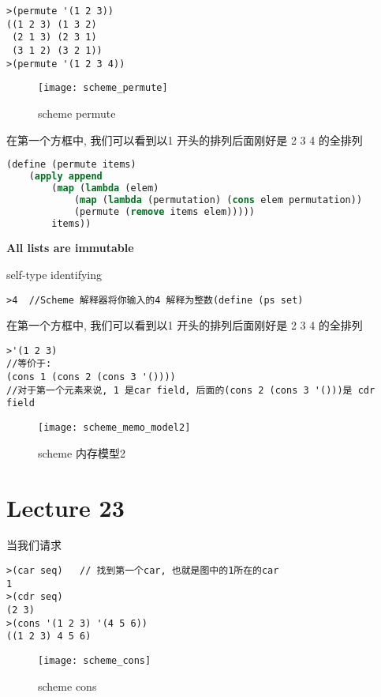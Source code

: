 \documentclass{article}
\begin{document}
\begin{verbatim}
>(permute '(1 2 3))
((1 2 3) (1 3 2)
 (2 1 3) (2 3 1)
 (3 1 2) (3 2 1))
>(permute '(1 2 3 4))
\end{verbatim}
\begin{figure}[htbp]
	\centering
	\texttt{[image: scheme\_permute]}\\
	\caption{scheme permute}\label{fig.scheme.permute}
\end{figure}

在第一个方框中, 我们可以看到以1 开头的排列后面刚好是 2 3 4 的全排列

\begin{lstlisting}[language = Lisp]
(define (permute items)
	(apply append
		(map (lambda (elem)
			(map (lambda (permutation) (cons elem permutation))
			(permute (remove items elem)))))
		items))
\end{lstlisting}

\textbf{All lists are immutable}

self-type identifying
\begin{verbatim}
>4  //Scheme 解释器将你输入的4 解释为整数(define (ps set)
\end{verbatim}
在第一个方框中, 我们可以看到以1 开头的排列后面刚好是 2 3 4 的全排列

\begin{verbatim}
>'(1 2 3)
//等价于:
(cons 1 (cons 2 (cons 3 '())))
//对于第一个元素来说, 1 是car field, 后面的(cons 2 (cons 3 '()))是 cdr field
\end{verbatim}
\begin{figure}[htbp]
	\centering
	\texttt{[image: scheme\_memo\_model2]}\\
	\caption{scheme 内存模型2}\label{fig.scheme.memo.model2}
\end{figure}

\section{Lecture 23}
当我们请求
\begin{verbatim}
>(car seq)   // 找到第一个car, 也就是图中的1所在的car
1
>(cdr seq)
(2 3)
>(cons '(1 2 3) '(4 5 6))
((1 2 3) 4 5 6)
\end{verbatim}
\begin{figure}[htbp]
	\centering
	\texttt{[image: scheme\_cons]}\\
	\caption{scheme cons}\label{fig.scheme.cons}
\end{figure}
\end{document}

